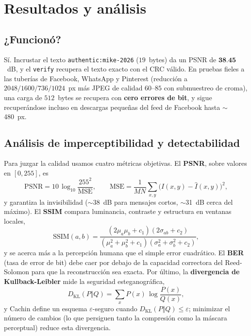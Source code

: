 \documentclass[12pt,a4paper]{article}
\renewcommand{\nobreakdash}{}
\begin{document}
\section{Resultados y análisis}
\label{sec:result}

\subsection{¿Funcionó?}
Sí. Incrustar el texto \texttt{authentic:mike-2026} ($19$~bytes) da un PSNR de
$\mathbf{38{.}45}$~dB, y el \texttt{verify} recupera el texto exacto con el CRC válido. En
pruebas fieles a las tuberías de Facebook, WhatsApp y Pinterest (reducción a
$2048/1600/736/1024$~px más JPEG de calidad $60$--$85$ con submuestreo de croma), una carga
de $512$~bytes se recupera con \textbf{cero errores de bit}, y sigue recuperándose incluso en
descargas pequeñas del feed de Facebook hasta $\sim$480~px.

\subsection{Análisis de imperceptibilidad y detectabilidad}
Para juzgar la calidad usamos cuatro métricas objetivas. El \textbf{PSNR}, sobre valores en
$[0,255]$, es
\begin{equation}
\mathrm{PSNR} = 10\,\log_{10}\!\frac{255^2}{\mathrm{MSE}}, \qquad
\mathrm{MSE}=\frac{1}{MN}\sum_{x,y}\big(I(x,y)-\hat I(x,y)\big)^2 ,
\end{equation}
y garantiza la invisibilidad ($\sim$38~dB para mensajes cortos, $\sim$31~dB cerca del
máximo). El \textbf{SSIM} \cite{wang2004ssim} compara luminancia, contraste y estructura en
ventanas locales,
\begin{equation}
\mathrm{SSIM}(a,b)=\frac{(2\mu_a\mu_b+c_1)(2\sigma_{ab}+c_2)}
{(\mu_a^2+\mu_b^2+c_1)(\sigma_a^2+\sigma_b^2+c_2)},
\end{equation}
y se acerca más a la percepción humana que el simple error cuadrático. El \textbf{BER} (tasa
de error de bit) debe caer por debajo de la capacidad correctora del Reed\nobreakdash-Solomon
para que la reconstrucción sea exacta. Por último, la \textbf{divergencia de
Kullback\nobreakdash-Leibler} \cite{kullback1951} mide la seguridad esteganográfica,
\begin{equation}
D_{\mathrm{KL}}(P\Vert Q) = \sum_{x} P(x)\,\log\frac{P(x)}{Q(x)} ,
\end{equation}
y Cachin \cite{cachin1998} define un esquema $\varepsilon$\nobreakdash-seguro cuando
$D_{\mathrm{KL}}(P\Vert Q)\le\varepsilon$; minimizar el número de cambios (lo que persiguen
tanto la compresión como la máscara perceptual) reduce esta divergencia.
\end{document}

